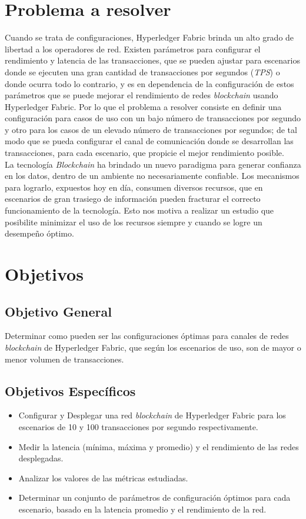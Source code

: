 \section{Problema a resolver}
Cuando se trata de configuraciones, Hyperledger Fabric brinda un alto grado de libertad a los operadores de red. Existen par\'ametros para configurar el rendimiento y latencia de las transacciones, que se pueden ajustar para escenarios donde se ejecuten una gran cantidad de transacciones por segundos (\emph{TPS}) o donde ocurra todo lo contrario, y es en dependencia de la configuraci\'on de estos par\'ametros que se puede mejorar el rendimiento de redes \emph{blockchain} usando Hyperledger Fabric. Por lo que el problema a resolver consiste en definir una configuraci\'on para casos de uso con un bajo n\'umero de transacciones por segundo y otro para los casos de un elevado n\'umero de transacciones por segundos; de tal modo que se pueda configurar el canal de comunicaci\'on donde se desarrollan las transacciones, para cada escenario, que propicie el mejor rendimiento posible.\\

La tecnolog\'ia \emph{Blockchain} ha brindado un nuevo paradigma para generar confianza en los datos, dentro de un ambiente no necesariamente confiable. Los mecanismos para lograrlo, expuestos hoy en d\'ia, consumen diversos recursos, que en escenarios de gran trasiego de informaci\'on pueden fracturar el correcto funcionamiento de la tecnolog\'ia. Esto nos motiva a realizar un estudio que posibilite minimizar el uso de los recursos siempre y cuando se logre un desempe\~no \'optimo.


\section{Objetivos}
\subsection{Objetivo General}
Determinar como pueden ser las configuraciones \'optimas para canales de redes \emph{blockchain} de Hyperledger Fabric, que seg\'un los escenarios de uso, son de mayor o menor volumen de transacciones.

{\vspace{0.5 cm}}

\subsection{Objetivos Espec\'ificos}
\begin{itemize}
\item Configurar y Desplegar una red \emph{blockchain} de Hyperledger Fabric para los escenarios de 10 y 100 transacciones por segundo respectivamente.
\item Medir la latencia (m\'inima, m\'axima y promedio) y el rendimiento de las redes desplegadas.
\item Analizar los valores de las m\'etricas estudiadas.
\item Determinar un conjunto de par\'ametros de configuraci\'on \'optimos para cada escenario, basado en la latencia promedio y el rendimiento de la red.
\end{itemize}

